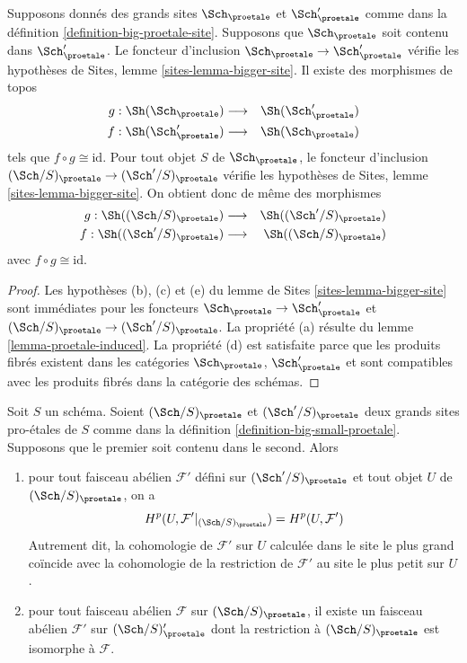 \begin{lemma}
\label{lemma-change-alpha}
Supposons donnés des grands sites $\Sch_\proetale$ et $\Sch'_\proetale$ comme dans la
définition \ref{definition-big-proetale-site}.
Supposons que $\Sch_\proetale$ soit contenu dans $\Sch'_\proetale$.
Le foncteur d'inclusion $\Sch_\proetale \to \Sch'_\proetale$ vérifie
les hypothèses de Sites, lemme \ref{sites-lemma-bigger-site}.
Il existe des morphismes de topos
\begin{eqnarray*}
g : \Sh(\Sch_\proetale) &
\longrightarrow &
\Sh(\Sch'_\proetale) \\
f : \Sh(\Sch'_\proetale) &
\longrightarrow &
\Sh(\Sch_\proetale)
\end{eqnarray*}
tels que $f \circ g \cong \text{id}$. Pour tout objet $S$
de $\Sch_\proetale$, le foncteur d'inclusion
$(\Sch/S)_\proetale \to (\Sch'/S)_\proetale$ vérifie
les hypothèses de Sites, lemme \ref{sites-lemma-bigger-site}.
On obtient donc de même des morphismes
\begin{eqnarray*}
g : \Sh((\Sch/S)_\proetale) &
\longrightarrow &
\Sh((\Sch'/S)_\proetale) \\
f : \Sh((\Sch'/S)_\proetale) &
\longrightarrow &
\Sh((\Sch/S)_\proetale)
\end{eqnarray*}
avec $f \circ g \cong \text{id}$.
\end{lemma}

\begin{proof}
Les hypothèses (b), (c) et (e) du
lemme de Sites \ref{sites-lemma-bigger-site}
sont immédiates pour les foncteurs
$\Sch_\proetale \to \Sch'_\proetale$ et
$(\Sch/S)_\proetale \to (\Sch'/S)_\proetale$. La propriété (a) résulte du
lemme \ref{lemma-proetale-induced}.
La propriété (d) est satisfaite parce que
les produits fibrés existent dans les catégories $\Sch_\proetale$, $\Sch'_\proetale$
et sont compatibles avec les produits fibrés dans la catégorie des schémas.
\end{proof}

\begin{lemma}
\label{lemma-cohomology-enlarge-partial-universe}
Soit $S$ un schéma. Soient $(\Sch/S)_\proetale$ et $(\Sch'/S)_\proetale$ deux
grands sites pro-\'etales de $S$ comme dans la
définition \ref{definition-big-small-proetale}.
Supposons que le premier soit contenu dans
le second. Alors
\begin{enumerate}
\item pour tout faisceau abélien $\mathcal{F}'$ défini sur $(\Sch'/S)_\proetale$
et tout objet $U$ de $(\Sch/S)_\proetale$, on a
$$
H^p(U, \mathcal{F}'|_{(\Sch/S)_\proetale}) =
H^p(U, \mathcal{F}')
$$
Autrement dit, la cohomologie de $\mathcal{F}'$ sur $U$ calculée dans le site le plus grand
coïncide avec la cohomologie de la restriction de $\mathcal{F}'$ au site le plus petit
sur $U$.
\item pour tout faisceau abélien $\mathcal{F}$ sur $(\Sch/S)_\proetale$, il existe un
faisceau abélien $\mathcal{F}'$ sur $(\Sch/S)_\proetale'$ dont la restriction à
$(\Sch/S)_\proetale$ est isomorphe à $\mathcal{F}$.
\end{enumerate}
\end{lemma}


